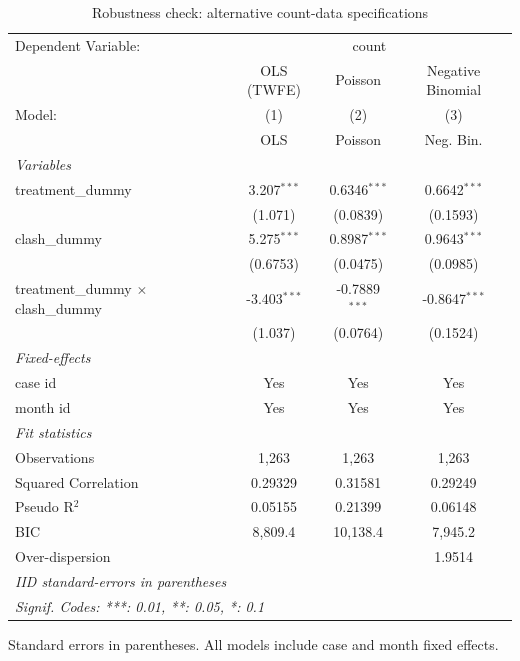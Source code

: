 \begin{table}[htbp]
   \caption{\label{tab:robustness_twfe} Robustness check: alternative count-data specifications}
   \centering
   \begin{tabular}{lccc}
      \tabularnewline \midrule \midrule
      Dependent Variable: & \multicolumn{3}{c}{count}\\
                                                & OLS (TWFE)     & Poisson         & Negative Binomial \\   
      Model:                                    & (1)            & (2)             & (3)\\  
                                                &  OLS           & Poisson         & Neg. Bin.\\  
      \midrule
      \emph{Variables}\\
      treatment\_dummy                          & 3.207$^{***}$  & 0.6346$^{***}$  & 0.6642$^{***}$\\   
                                                & (1.071)        & (0.0839)        & (0.1593)\\   
      clash\_dummy                              & 5.275$^{***}$  & 0.8987$^{***}$  & 0.9643$^{***}$\\   
                                                & (0.6753)       & (0.0475)        & (0.0985)\\   
      treatment\_dummy $\times$ clash\_dummy    & -3.403$^{***}$ & -0.7889$^{***}$ & -0.8647$^{***}$\\   
                                                & (1.037)        & (0.0764)        & (0.1524)\\   
      \midrule
      \emph{Fixed-effects}\\
      case id                                  & Yes            & Yes             & Yes\\  
      month id                                 & Yes            & Yes             & Yes\\  
      \midrule
      \emph{Fit statistics}\\
      Observations                              & 1,263          & 1,263           & 1,263\\  
      Squared Correlation                       & 0.29329        & 0.31581         & 0.29249\\  
      Pseudo R$^2$                              & 0.05155        & 0.21399         & 0.06148\\  
      BIC                                       & 8,809.4        & 10,138.4        & 7,945.2\\  
      Over-dispersion                           &                &                 & 1.9514\\  
      \midrule \midrule
      \multicolumn{4}{l}{\emph{IID standard-errors in parentheses}}\\
      \multicolumn{4}{l}{\emph{Signif. Codes: ***: 0.01, **: 0.05, *: 0.1}}\\
   \end{tabular}
   
   \par \raggedright 
   Standard errors in parentheses. All models include case and month fixed effects.
\end{table}
